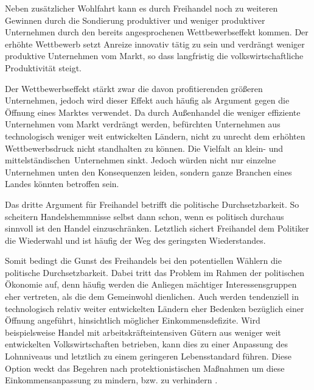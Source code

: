 Neben zus{\"a}tzlicher Wohlfahrt kann es durch Freihandel noch zu weiteren Gewinnen durch die Sondierung produktiver und weniger produktiver Unternehmen durch den bereits angesprochenen Wettbewerbseffekt kommen. Der erh{\"o}hte Wettbewerb setzt Anreize innovativ t{\"a}tig zu sein und verdr{\"a}ngt weniger produktive Unternehmen vom Markt, so dass lang\-fri\-stig die volkswirtschaftliche Produktivit{\"a}t steigt. \newline


Der Wettbewerbseffekt st{\"a}rkt zwar die davon profitierenden gr{\"o}{\ss}eren Unternehmen, jedoch wird dieser Effekt auch h{\"a}ufig als Argument gegen die {\"O}ffnung eines Marktes verwendet. Da durch Au{\ss}enhandel die weniger effiziente Unternehmen vom Markt verdr{\"a}ngt werden, bef{\"u}rchten Unternehmen aus technologisch weniger weit entwickelten L{\"a}ndern, nicht zu unrecht dem erh{\"o}hten Wettbewerbsdruck nicht standhalten zu k{\"o}nnen. Die Vielfalt an klein- und mittelst{\"a}ndischen~Unternehmen sinkt. Jedoch w{\"u}rden nicht nur einzelne Unternehmen unten den Konsequenzen leiden, sondern ganze Branchen eines Landes k{\"o}nnten betroffen sein.\newline


Das dritte Argument f{\"u}r Freihandel betrifft die politische Durchsetzbarkeit. So scheitern  Handelshemmnisse selbst dann schon, wenn  es politisch durchaus sinnvoll ist den Handel einzuschr{\"a}nken. Letztlich sichert Freihandel dem Politiker die Wiederwahl und ist h{\"a}ufig der Weg des geringsten Wiederstandes. \newline 


Somit bedingt die Gunst des Freihandels bei den potentiellen W{\"a}hlern die politische Durchsetzbarkeit. Dabei tritt das Problem im Rahmen der politischen {\"O}konomie auf, denn häufig werden die Anliegen m{\"a}chtiger Interessensgruppen eher vertreten, als die dem Gemeinwohl dienlichen. Auch werden tendenziell in technologisch relativ weiter entwickelten L{\"a}ndern eher Bedenken bez{\"u}glich einer {\"O}ffnung angef{\"u}hrt, hinsichtlich m{\"o}glicher Einkommensdefizite. Wird beispielsweise Handel mit arbeitskr{\"a}fteintensiven G{\"u}tern aus weniger weit entwickelten Volkswirtschaften betrieben, kann dies zu einer Anpassung des Lohnniveaus und letztlich zu einem geringeren Lebensstandard f{\"u}hren. Diese Option weckt das Begehren nach protektionistischen Ma{\ss}nahmen um diese Einkommensanpassung zu mindern, bzw. zu verhindern \citep[Kapitel 1]{Krugman.2015}.\newline


